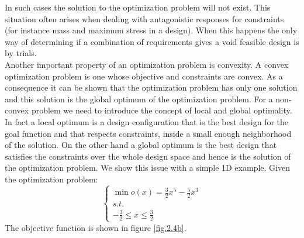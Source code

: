 In such cases the solution to the optimization problem will not exist. This situation often arises when dealing with antagonistic responses for constraints (for instance mass and maximum stress in a design). When this happens the only way of determining if a combination of requirements gives a void feasible design is by trials.\\
Another important property of an optimization problem is convexity.
A convex optimization problem is one whose objective and constraints are convex. As a consequence it can be shown that the optimization problem has only one solution and this solution is the global optimum of the optimization problem. For a non-convex problem we need to introduce the concept of local and global optimality. In fact a local optimum is a design configuration that is the best design for the goal function and that respects constraints, inside a small enough neighborhood of the solution. On the other hand a global optimum is the best design that satisfies the constraints over the whole design space and hence is the solution of the optimization problem.
We show this issue with a simple 1D example. 
Given the optimization problem:
\begin{equation}
\label{example_problem}
\begin{cases}
\min o(x)=\frac{3}{2}x^5-\frac{5}{2}x^3\\
s.t.\\
-\frac{3}{2}\leq x \leq \frac{3}{2}
\end{cases}
\end{equation}
The objective function is shown in figure \ref{fig.2.4b}.

